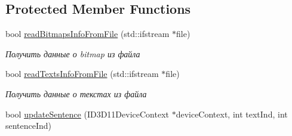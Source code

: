 \subsection*{Protected Member Functions}
\begin{DoxyCompactItemize}
\item 
bool \hyperlink{class_interface_element_class_a80958e5556a2970645b65a56431c88ca}{read\+Bitmaps\+Info\+From\+File} (std\+::ifstream $\ast$file)
\begin{DoxyCompactList}\small\item\em Получить данные о bitmap из файла \end{DoxyCompactList}\item 
bool \hyperlink{class_interface_element_class_afc8ee340b6aa0b99e3280b424aa5c519}{read\+Texts\+Info\+From\+File} (std\+::ifstream $\ast$file)
\begin{DoxyCompactList}\small\item\em Получить данные о текстах из файла \end{DoxyCompactList}\item 
bool \hyperlink{class_interface_element_class_aa1908c476bd6d840acd22dd137fcbd00}{update\+Sentence} (I\+D3\+D11\+Device\+Context $\ast$device\+Context, int text\+Ind, int sentence\+Ind)
\end{DoxyCompactItemize}
